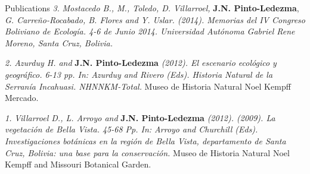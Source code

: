\documentclass{resume} %
\begin{document}
\begin{rSection}{Publications}
{\em 3.} {\em Mostacedo B., M., Toledo, D. Villarroel,} {\bf{J.N. Pinto-Ledezma}}, {\em G. Carreño-Rocabado, B. Flores and Y. Uslar. (2014). Memorias del IV Congreso Boliviano de Ecología. 4-6 de Junio 2014. Universidad Autónoma Gabriel Rene Moreno, Santa Cruz, Bolivia.}

{\em 2.} {\em Azurduy H. and} {\bf{J.N. Pinto-Ledezma}} {\em (2012). El escenario ecológico y geográfico. 6-13 pp. In: Azurduy and Rivero (Eds). Historia Natural de la Serranía Incahuasi. NHNNKM-Total.} {Museo de Historia Natural Noel Kempff Mercado}. 

{\em 1.} {\em Villarroel D., L. Arroyo and} {\bf{J.N. Pinto-Ledezma}} {\em (2012). (2009). La vegetación de Bella Vista. 45-68 Pp. In: Arroyo and Churchill (Eds). Investigaciones botánicas en la región de Bella Vista, departamento de Santa Cruz, Bolivia: una base para la conservación.} {Museo de Historia Natural Noel Kempff and Missouri Botanical Garden}. 

\end{rSection}
\end{document}
